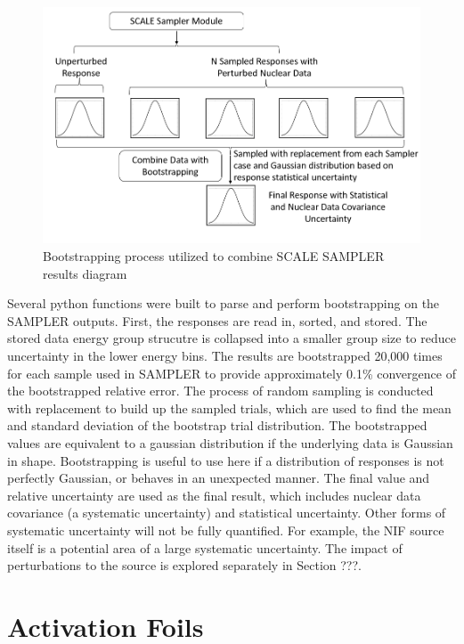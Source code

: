 \begin{figure}[ht]
	\includegraphics[width=\linewidth]{Figures/Chapter3/Bootstrapping.png}
	\caption{Bootstrapping  process utilized to combine SCALE SAMPLER results diagram}
	\label{fig:boot}
\end{figure}

Several python functions were built to parse and perform bootstrapping on the SAMPLER outputs.
First, the responses are read in, sorted, and stored. 
The stored data energy group strucutre is collapsed into a smaller group size to reduce uncertainty in the lower energy bins. 
The results are bootstrapped
20,000 times for each sample used in
SAMPLER to provide approximately 0.1\% convergence of the
bootstrapped relative error. The process of random sampling
is conducted with replacement to build up the sampled trials,
which are used to find the mean and standard deviation of the
bootstrap trial distribution.
The bootstrapped values are equivalent to a gaussian
distribution if the underlying data is Gaussian in shape. Bootstrapping
is useful to use here if a distribution of responses is
not perfectly Gaussian, or behaves in an unexpected manner.
The final value and relative uncertainty are used as the final result, which includes nuclear data covariance (a systematic uncertainty) and statistical uncertainty.
Other forms of systematic uncertainty will not be fully quantified. 
For example, the NIF source itself is a potential area of a large systematic uncertainty. 
The impact of perturbations to the source is explored separately in Section ???. 


\section{Activation Foils}

